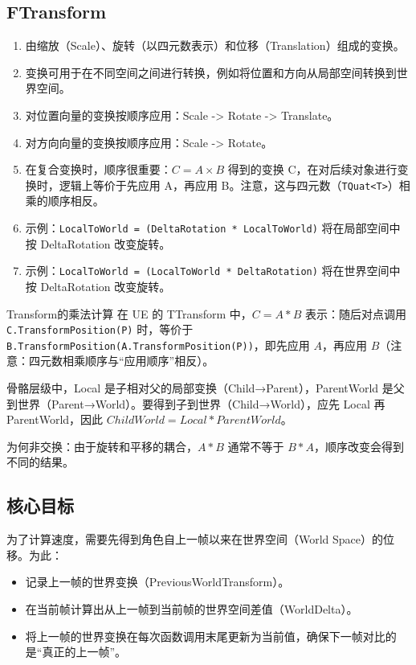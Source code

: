 \documentclass[math,code,12pt]{amznotes}
\newcommand{\il}[1]{\texttt{#1}}%
\begin{document}
		 \subsection{FTransform}
		 \begin{enumerate}
		 \item 由缩放（Scale）、旋转（以四元数表示）和位移（Translation）组成的变换。
		 \item  变换可用于在不同空间之间进行转换，例如将位置和方向从局部空间转换到世界空间。
		 \item  对位置向量的变换按顺序应用：Scale -> Rotate -> Translate。
		 \item  对方向向量的变换按顺序应用：Scale -> Rotate。
		 \item  在复合变换时，顺序很重要：$C = A \times B$ 得到的变换 C，在对后续对象进行变换时，逻辑上等价于先应用 A，再应用 B。注意，这与四元数（\il{TQuat<T>}）相乘的顺序相反。
		 \item  示例：\il{LocalToWorld = (DeltaRotation * LocalToWorld)} 将在局部空间中按 DeltaRotation 改变旋转。
		 \item  示例：\il{LocalToWorld = (LocalToWorld * DeltaRotation)} 将在世界空间中按 DeltaRotation 改变旋转。
		 \end{enumerate}
\begin{genbox}{Transform的乘法计算}
在 UE 的 TTransform 中，$C = A * B$ 表示：随后对点调用 \il{C.TransformPosition(P)} 时，等价于 \il{B.TransformPosition(A.TransformPosition(P))}，即先应用 $A$，再应用 $B$（注意：四元数相乘顺序与“应用顺序”相反）。

骨骼层级中，Local 是子相对父的局部变换（Child→Parent），ParentWorld 是父到世界（Parent→World）。要得到子到世界（Child→World），应先 Local 再 ParentWorld，因此 $ChildWorld = Local * ParentWorld$。

为何非交换：由于旋转和平移的耦合，$A * B$ 通常不等于 $B * A$，顺序改变会得到不同的结果。
\end{genbox}		 


\subsection*{核心目标}
为了计算速度，需要先得到角色自上一帧以来在世界空间（World Space）的位移。为此：
\begin{itemize}
\item 记录上一帧的世界变换（PreviousWorldTransform）。
\item 在当前帧计算出从上一帧到当前帧的世界空间差值（WorldDelta）。
\item 将上一帧的世界变换在每次函数调用末尾更新为当前值，确保下一帧对比的是“真正的上一帧”。
\end{itemize}
\end{document}
